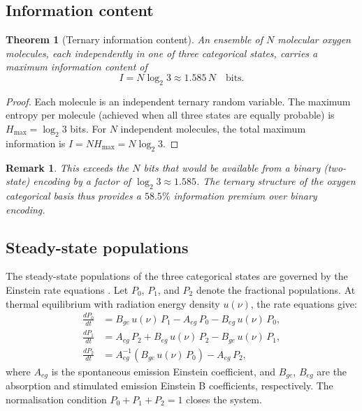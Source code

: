 \documentclass[11pt,twocolumn,a4paper]{article}
\newtheorem{theorem}{Theorem}
\newtheorem{remark}{Remark}
\begin{document}
\subsection{Information content}

\begin{theorem}[Ternary information content]\label{thm:info_ternary}
An ensemble of $N$ molecular oxygen molecules, each independently in one of three categorical states, carries a maximum information content of
\begin{equation}\label{eq:info_ternary}
I = N \log_2 3 \approx 1.585\, N \quad \text{bits}.
\end{equation}
\end{theorem}
\begin{proof}
Each molecule is an independent ternary random variable.
The maximum entropy per molecule (achieved when all three states are equally probable) is $H_{\max} = \log_2 3$ bits.
For $N$ independent molecules, the total maximum information is $I = N H_{\max} = N \log_2 3$.
\end{proof}

\begin{remark}
This exceeds the $N$ bits that would be available from a binary (two-state) encoding by a factor of $\log_2 3 \approx 1.585$.
The ternary structure of the oxygen categorical basis thus provides a $58.5\%$ information premium over binary encoding.
\end{remark}

\subsection{Steady-state populations}

The steady-state populations of the three categorical states are governed by the Einstein rate equations \citep{Einstein1917,Hilborn2002}.
Let $P_0$, $P_1$, and $P_2$ denote the fractional populations.
At thermal equilibrium with radiation energy density $u(\nu)$, the rate equations give:
\begin{align}
\frac{dP_0}{dt} &= B_{ge}\, u(\nu)\, P_1 - A_{eg}\, P_0 - B_{eg}\, u(\nu)\, P_0, \label{eq:rate0} \\
\frac{dP_1}{dt} &= A_{eg}\, P_2 + B_{eg}\, u(\nu)\, P_2 - B_{ge}\, u(\nu)\, P_1, \label{eq:rate1} \\
\frac{dP_2}{dt} &= A_{eg}^{-1}(B_{ge}\, u(\nu)\, P_0) - A_{eg}\, P_2, \label{eq:rate2}
\end{align}
where $A_{eg}$ is the spontaneous emission Einstein coefficient, and $B_{ge}$, $B_{eg}$ are the absorption and stimulated emission Einstein B coefficients, respectively.
The normalisation condition $P_0 + P_1 + P_2 = 1$ closes the system.
\end{document}
